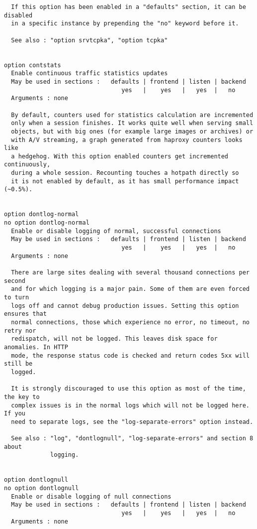 \begin{verbatim}
  If this option has been enabled in a "defaults" section, it can be disabled
  in a specific instance by prepending the "no" keyword before it.

  See also : "option srvtcpka", "option tcpka"


option contstats
  Enable continuous traffic statistics updates
  May be used in sections :   defaults | frontend | listen | backend
                                 yes   |    yes   |   yes  |   no
  Arguments : none

  By default, counters used for statistics calculation are incremented
  only when a session finishes. It works quite well when serving small
  objects, but with big ones (for example large images or archives) or
  with A/V streaming, a graph generated from haproxy counters looks like
  a hedgehog. With this option enabled counters get incremented continuously,
  during a whole session. Recounting touches a hotpath directly so
  it is not enabled by default, as it has small performance impact (~0.5%).


option dontlog-normal
no option dontlog-normal
  Enable or disable logging of normal, successful connections
  May be used in sections :   defaults | frontend | listen | backend
                                 yes   |    yes   |   yes  |   no
  Arguments : none

  There are large sites dealing with several thousand connections per second
  and for which logging is a major pain. Some of them are even forced to turn
  logs off and cannot debug production issues. Setting this option ensures that
  normal connections, those which experience no error, no timeout, no retry nor
  redispatch, will not be logged. This leaves disk space for anomalies. In HTTP
  mode, the response status code is checked and return codes 5xx will still be
  logged.

  It is strongly discouraged to use this option as most of the time, the key to
  complex issues is in the normal logs which will not be logged here. If you
  need to separate logs, see the "log-separate-errors" option instead.

  See also : "log", "dontlognull", "log-separate-errors" and section 8 about
             logging.


option dontlognull
no option dontlognull
  Enable or disable logging of null connections
  May be used in sections :   defaults | frontend | listen | backend
                                 yes   |    yes   |   yes  |   no
  Arguments : none


\end{verbatim}
